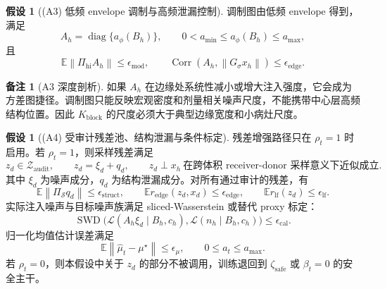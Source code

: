\documentclass[11pt,a4paper,UTF8,fontset=fandol]{ctexart}
\theoremstyle{definition}
\newtheorem{assumption}[theorem]{假设}
\newtheorem{remark}[theorem]{备注}
\DeclareMathOperator{\diag}{diag}
\DeclareMathOperator{\SWD}{SWD}
\newcommand{\norm}[1]{\left\lVert#1\right\rVert}
\newcommand{\E}{\mathbb{E}}
\newcommand{\cZ}{\mathcal{Z}}
\begin{document}
\begin{assumption}[(A3) 低频 envelope 调制与高频泄漏控制]
调制图由低频 envelope 得到，满足
\begin{equation}
\label{eq:mod-bound-assumption-coreA}
    A_h=\diag\{a_\phi(B_h)\},
    \qquad
    0<a_{\min}\le a_\phi(B_h)\le a_{\max},
\end{equation}
且
\begin{equation}
\label{eq:a-mod-leak-coreA}
    \E\norm{\Pi_{\mathrm{hi}}A_h}\le\epsilon_{\mathrm{mod}},
    \qquad
    \operatorname{Corr}(A_h,\norm{G_\sigma x_h})\le\epsilon_{\mathrm{edge}}.
\end{equation}
\end{assumption}

\begin{remark}[A3 深度剖析]
如果 $A_h$ 在边缘处系统性减小或增大注入强度，它会成为方差图捷径。调制图只能反映宏观密度和剂量相关噪声尺度，不能携带中心层高频结构位置。因此 $K_{\mathrm{block}}$ 的尺度必须大于典型边缘宽度和小病灶尺度。
\end{remark}


\begin{assumption}[(A4) 受审计残差池、结构泄漏与条件标定]
残差增强路径只在 $\rho_t=1$ 时启用。若 $\rho_t=1$，则采样残差满足
\begin{equation}
\label{eq:a4-z-decomp-auditA}
    z_d\in\cZ_{\mathrm{audit}},
    \qquad
    z_d=\xi_d+q_d,
    \qquad
    z_d\perp x_h \ \text{在跨体积 receiver-donor 采样意义下近似成立}.
\end{equation}
其中 $\xi_d$ 为噪声成分，$q_d$ 为结构泄漏成分。对所有通过审计的残差，有
\begin{equation}
\label{eq:a4-struct-auditA}
    \E\norm{\Pi_{\mathcal S}q_d}\le\epsilon_{\mathrm{struct}},
    \qquad
    \E r_{\mathrm{edge}}(z_d,x_d)\le\epsilon_{\mathrm{edge}},
    \qquad
    \E r_{\mathrm{lf}}(z_d)\le\epsilon_{\mathrm{lf}}.
\end{equation}
实际注入噪声与目标噪声族满足 sliced-Wasserstein 或替代 proxy 标定：
\begin{equation}
\label{eq:a4-calibration-auditA}
    \SWD\big(\mathcal L(A_h\xi_d\mid B_h,c_h),\mathcal L(n_h\mid B_h,c_h)\big)
    \le\epsilon_{\mathrm{cal}}.
\end{equation}
归一化均值估计误差满足
\begin{equation}
    \E\norm{\hat\mu_t-\mu^\star}\le\epsilon_\mu,
    \qquad
    0\le a_t\le a_{\max}.
\end{equation}
若 $\rho_t=0$，则本假设中关于 $z_d$ 的部分不被调用，训练退回到 $\zeta_{\mathrm{safe}}$ 或 $\beta_t=0$ 的安全主干。
\end{assumption}
\end{document}
